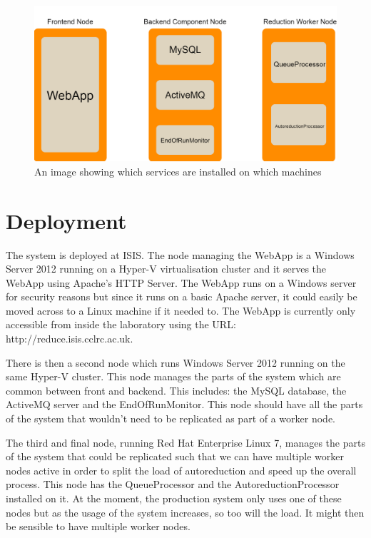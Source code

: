 \documentclass[twocolumn]{article}
\begin{document}
\begin{figure}
	\centering\includegraphics[width=0.8\linewidth]{machine_layout.png}
	\caption{An image showing which services are installed on which machines}
	\label{fig:machine_layout}
\end{figure}

\section{Deployment}\label{deployment}

The system is deployed at ISIS. The node managing the WebApp is a Windows Server 2012
running on a Hyper-V\cite{hyper-v} virtualisation cluster and it serves the WebApp using
Apache's HTTP Server\cite{apache}. The WebApp runs on a Windows server for security reasons
but since it runs on a basic Apache server, it could easily be moved across to a Linux machine
if it needed to. The WebApp is currently only accessible from inside the laboratory using the 
URL: http://reduce.isis.cclrc.ac.uk.

There is then a second node which runs Windows Server 2012 running on the same Hyper-V cluster. This node
manages the parts of the system which are common between front and backend. This includes:
the MySQL database, the ActiveMQ server and the EndOfRunMonitor. This node should have
all the parts of the system that wouldn't need to be replicated as part of a worker node.

The third and final node, running Red Hat Enterprise Linux 7\cite{rhel}, manages the parts of the system that could be replicated such that 
we can have multiple worker nodes active in order to split the load of autoreduction and speed
up the overall process. This node has the QueueProcessor and the AutoreductionProcessor installed
on it. At the moment, the production system only uses one of these nodes but as the usage of the 
system increases, so too will the load. It might then be sensible to have multiple worker nodes.
\end{document}
